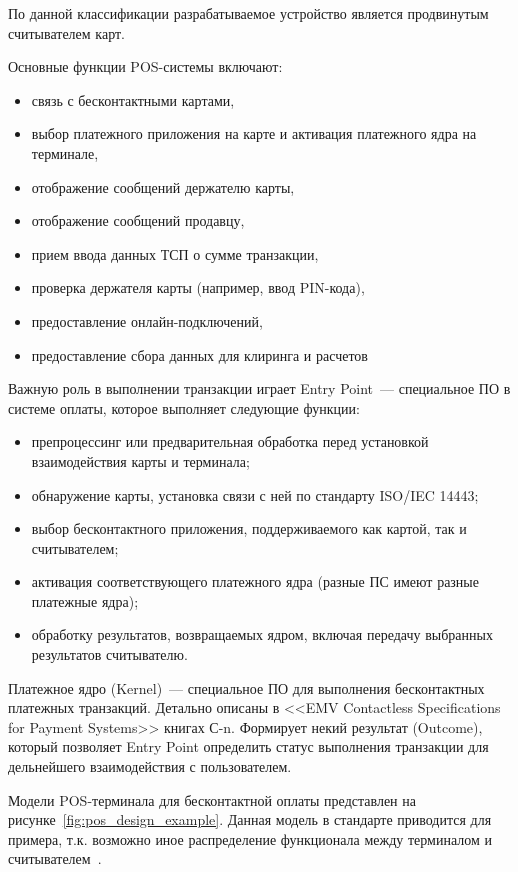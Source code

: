 По данной классификации разрабатываемое устройство является продвинутым считывателем карт.

Основные функции POS-системы включают:
\begin{itemize}
    \item связь с бесконтактными картами,
    \item выбор платежного приложения на карте и активация платежного ядра на терминале,
    \item отображение сообщений держателю карты,
    \item отображение сообщений продавцу,
    \item прием ввода данных ТСП о сумме транзакции,
    \item проверка держателя карты (например, ввод PIN-кода),
    \item предоставление онлайн-подключений,
    \item предоставление сбора данных для клиринга и расчетов
\end{itemize}

Важную роль в выполнении транзакции играет Entry Point~--- специальное ПО в системе оплаты, которое выполняет следующие функции:
\begin{itemize}
    \item препроцессинг или предварительная обработка перед установкой взаимодействия карты и терминала;
    \item обнаружение карты, установка связи с ней по стандарту ISO/IEC 14443;
    \item выбор бесконтактного приложения, поддерживаемого как картой, так и считывателем;
    \item активация соответствующего платежного ядра (разные ПС имеют разные платежные ядра);
    \item обработку результатов, возвращаемых ядром, включая передачу выбранных результатов считывателю.
\end{itemize}

Платежное ядро (Kernel)~--- специальное ПО для выполнения бесконтактных платежных транзакций.
Детально описаны в <<EMV Contactless Specifications for Payment Systems>> книгах С-n.
Формирует некий результат (Outcome), который позволяет Entry Point определить статус выполнения транзакции для дельнейшего взаимодействия с пользователем.

Модели POS-терминала для бесконтактной оплаты представлен на рисунке~\ref{fig:pos_design_example}.
Данная модель в стандарте приводится для примера, т.к. возможно иное распределение функционала между терминалом и считывателем~\cite{emv_book_A}.

